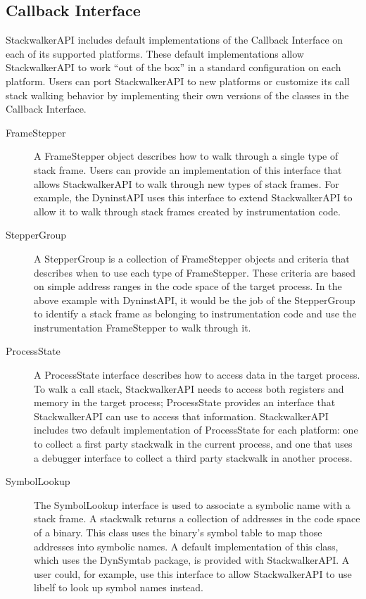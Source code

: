 \subsection{Callback Interface}
StackwalkerAPI includes default implementations of the Callback Interface on
each of its supported platforms. These default implementations allow
StackwalkerAPI to work ``out of the box'' in a standard configuration on each
platform. Users can port StackwalkerAPI to new platforms or customize its call
stack walking behavior by implementing their own versions of the classes in the
Callback Interface.

\begin{description}
\item [FrameStepper] A FrameStepper object describes how to walk through a
    single type of stack frame. Users can provide an implementation of this
    interface that allows StackwalkerAPI to walk through new types of stack
    frames. For example, the DyninstAPI uses this interface to extend
    StackwalkerAPI to allow it to walk through stack frames created by
    instrumentation code.

\item [StepperGroup] A StepperGroup is a collection of FrameStepper objects and
    criteria that describes when to use each type of FrameStepper. These
    criteria are based on simple address ranges in the code space of the target
    process. In the above example with DyninstAPI, it would be the job of the
    StepperGroup to identify a stack frame as belonging to instrumentation code
    and use the instrumentation FrameStepper to walk through it.

\item [ProcessState] A ProcessState interface describes how to access data in
    the target process. To walk a call stack, StackwalkerAPI needs to access
    both registers and memory in the target process; ProcessState provides an
    interface that StackwalkerAPI can use to access that information.
    StackwalkerAPI includes two default implementation of ProcessState for each
    platform: one to collect a first party stackwalk in the current process, and
    one that uses a debugger interface to collect a third party stackwalk in
    another process.

\item [SymbolLookup] The SymbolLookup interface is used to associate a symbolic
    name with a stack frame. A stackwalk returns a collection of addresses in
    the code space of a binary. This class uses the binary's symbol table to map
    those addresses into symbolic names. A default implementation of this class,
    which uses the DynSymtab package, is provided with StackwalkerAPI. A user
    could, for example, use this interface to allow StackwalkerAPI to use libelf
    to look up symbol names instead.
\end{description}
